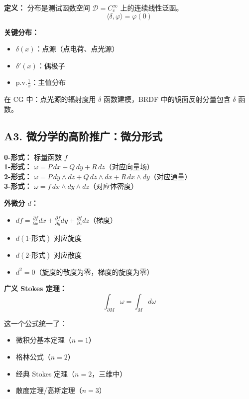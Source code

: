 \textbf{定义：} 分布是测试函数空间 $\mathcal{D} = C_c^\infty$ 上的连续线性泛函。
\[
\langle \delta, \varphi \rangle = \varphi(0)
\]

\textbf{关键分布：}
\begin{itemize}
  \item $\delta(x)$：点源（点电荷、点光源）
  \item $\delta'(x)$：偶极子
  \item $\text{p.v.}\frac{1}{x}$：主值分布
\end{itemize}

在 CG 中：点光源的辐射度用 $\delta$ 函数建模，BRDF 中的镜面反射分量包含 $\delta$ 函数。

\subsection{A3. 微分学的高阶推广：微分形式}

\textbf{0-形式：} 标量函数 $f$ \\
\textbf{1-形式：} $\omega = P\,dx + Q\,dy + R\,dz$（对应向量场） \\
\textbf{2-形式：} $\omega = P\,dy\wedge dz + Q\,dz\wedge dx + R\,dx\wedge dy$（对应通量） \\
\textbf{3-形式：} $\omega = f\,dx\wedge dy\wedge dz$（对应体密度）

\textbf{外微分 $d$：}
\begin{itemize}
  \item $df = \frac{\partial f}{\partial x}dx + \frac{\partial f}{\partial y}dy + \frac{\partial f}{\partial z}dz$（梯度）
  \item $d(\text{1-形式})$ 对应旋度
  \item $d(\text{2-形式})$ 对应散度
  \item $d^2 = 0$（旋度的散度为零，梯度的旋度为零）
\end{itemize}

\textbf{广义 Stokes 定理：}
\[
\boxed{\int_{\partial M} \omega = \int_M d\omega}
\]

这一个公式统一了：
\begin{itemize}
  \item 微积分基本定理（$n=1$）
  \item 格林公式（$n=2$）
  \item 经典 Stokes 定理（$n=2$，三维中）
  \item 散度定理/高斯定理（$n=3$）
\end{itemize}

